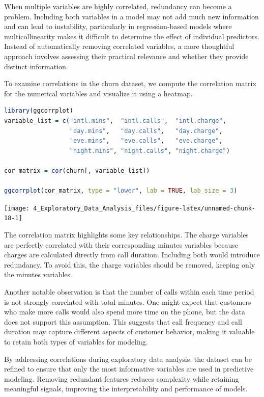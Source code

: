 \documentclass[
  11pt,
]{book}
\theoremstyle{definition}
\theoremstyle{definition}
\theoremstyle{definition}
\theoremstyle{definition}
\theoremstyle{remark}
\begin{document}
When multiple variables are highly correlated, redundancy can become a problem. Including both variables in a model may not add much new information and can lead to instability, particularly in regression-based models where multicollinearity makes it difficult to determine the effect of individual predictors. Instead of automatically removing correlated variables, a more thoughtful approach involves assessing their practical relevance and whether they provide distinct information.

To examine correlations in the churn dataset, we compute the correlation matrix for the numerical variables and visualize it using a heatmap.

\begin{lstlisting}[language=R]
library(ggcorrplot)  
variable_list = c("intl.mins",  "intl.calls",  "intl.charge", 
                  "day.mins",   "day.calls",   "day.charge",
                  "eve.mins",   "eve.calls",   "eve.charge",
                  "night.mins", "night.calls", "night.charge")

cor_matrix = cor(churn[, variable_list])

ggcorrplot(cor_matrix, type = "lower", lab = TRUE, lab_size = 3)
\end{lstlisting}

\begin{center}\texttt{[image: 4\_Exploratory\_Data\_Analysis\_files/figure-latex/unnamed-chunk-18-1]} \end{center}

The correlation matrix highlights some key relationships. The charge variables are perfectly correlated with their corresponding minutes variables because charges are calculated directly from call duration. Including both would introduce redundancy. To avoid this, the charge variables should be removed, keeping only the minutes variables.

Another notable observation is that the number of calls within each time period is not strongly correlated with total minutes. One might expect that customers who make more calls would also spend more time on the phone, but the data does not support this assumption. This suggests that call frequency and call duration may capture different aspects of customer behavior, making it valuable to retain both types of variables for modeling.

By addressing correlations during exploratory data analysis, the dataset can be refined to ensure that only the most informative variables are used in predictive modeling. Removing redundant features reduces complexity while retaining meaningful signals, improving the interpretability and performance of models.
\end{document}
